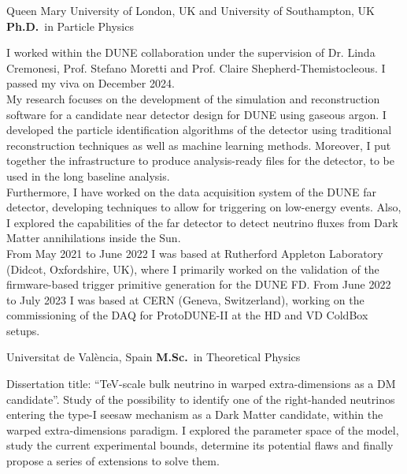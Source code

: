 	{%
		Queen Mary University of London, UK \newline \hfill and
		University of Southampton, UK}
	{%
		\textbf{Ph.D.}~in Particle Physics}
	{%
		\begin{justify}\noindent
			I worked within the DUNE collaboration under the supervision of Dr. Linda Cremonesi, Prof. Stefano Moretti and Prof. Claire Shepherd-Themistocleous. I passed my viva on December 2024. \newline \\
			My research focuses on the development of the simulation and reconstruction software for a candidate near detector design for DUNE using gaseous argon. I developed the particle identification algorithms of the detector using traditional reconstruction techniques as well as machine learning methods. Moreover, I put together the infrastructure to produce analysis-ready files for the detector, to be used in the long baseline analysis. \newline \\
			Furthermore, I have worked on the data acquisition system of the DUNE far detector, developing techniques to allow for triggering on low-energy events. Also, I explored the capabilities of the far detector to detect neutrino fluxes from Dark Matter annihilations inside the Sun.
			\newline \\
			From May 2021 to June 2022 I was based at Rutherford Appleton Laboratory (Didcot, Oxfordshire, UK), where I primarily worked on the validation of the firmware-based trigger primitive generation for the DUNE FD. \newline
			From June 2022 to July 2023 I was based at CERN (Geneva, Switzerland), working on the commissioning of the DAQ for ProtoDUNE-II at the HD and VD ColdBox setups.
		\end{justify}
	}

		{%
			Universitat de València, Spain}
		{%
			\textbf{M.Sc.}~in Theoretical Physics}
		{%
			\begin{justify}\noindent
				Dissertation title: ``TeV-scale bulk neutrino in warped extra-dimensions as a DM candidate''. \newline
				Study of the possibility to identify one of the right-handed neutrinos entering the type-I seesaw mechanism as a Dark Matter candidate, within the warped extra-dimensions paradigm. I explored the parameter space of the model, study the current experimental bounds, determine its potential flaws and finally propose a series of extensions to solve them.
			\end{justify}
		}

